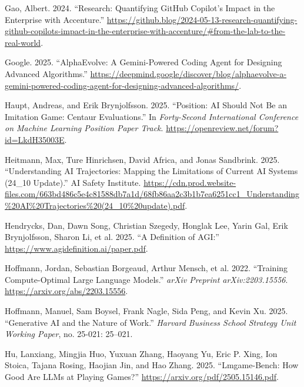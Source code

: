 \documentclass[
  letterpaper,
  DIV=11,
  numbers=noendperiod,
  oneside]{scrartcl}
\newlength{\cslhangindent}
\newenvironment{CSLReferences}[2] %
 {\begin{list}{}{%
  \setlength{\itemindent}{0pt}
  \setlength{\leftmargin}{0pt}
  \setlength{\parsep}{0pt}
  \ifodd #1
   \setlength{\leftmargin}{\cslhangindent}
   \setlength{\itemindent}{-1\cslhangindent}
  \fi
  \setlength{\itemsep}{#2\baselineskip}}}
 {\end{list}}
\begin{document}
\begin{CSLReferences}{1}{0}
Gao, Albert. 2024. {``Research: Quantifying GitHub Copilot's Impact in
the Enterprise with Accenture.''}
\url{https://github.blog/2024-05-13-research-quantifying-github-copilots-impact-in-the-enterprise-with-accenture/\#from-the-lab-to-the-real-world}.

Google. 2025. {``AlphaEvolve: A Gemini-Powered Coding Agent for
Designing Advanced Algorithms.''}
\url{https://deepmind.google/discover/blog/alphaevolve-a-gemini-powered-coding-agent-for-designing-advanced-algorithms/}.

Haupt, Andreas, and Erik Brynjolfsson. 2025. {``Position: {AI} Should
Not Be an Imitation Game: Centaur Evaluations.''} In \emph{Forty-Second
International Conference on Machine Learning Position Paper Track}.
\url{https://openreview.net/forum?id=LkdH35003E}.

Heitmann, Max, Ture Hinrichsen, David Africa, and Jonas Sandbrink. 2025.
{``Understanding AI Trajectories: Mapping the Limitations of Current AI
Systems (24\_10 Update).''} AI Safety Institute.
\url{https://cdn.prod.website-files.com/663bd486c5e4c81588db7a1d/68fb86aa2c3b1b7ea6251cc1_Understanding\%20AI\%20Trajectories\%20(24_10\%20update).pdf}.

Hendrycks, Dan, Dawn Song, Christian Szegedy, Honglak Lee, Yarin Gal,
Erik Brynjolfsson, Sharon Li, et al. 2025. {``A Definition of AGI:''}
\url{https://www.agidefinition.ai/paper.pdf}.

Hoffmann, Jordan, Sebastian Borgeaud, Arthur Mensch, et al. 2022.
{``Training Compute-Optimal Large Language Models.''} \emph{arXiv
Preprint arXiv:2203.15556}. \url{https://arxiv.org/abs/2203.15556}.

Hoffmann, Manuel, Sam Boysel, Frank Nagle, Sida Peng, and Kevin Xu.
2025. {``Generative AI and the Nature of Work.''} \emph{Harvard Business
School Strategy Unit Working Paper}, no. 25-021: 25--021.

Hu, Lanxiang, Mingjia Huo, Yuxuan Zhang, Haoyang Yu, Eric P. Xing, Ion
Stoica, Tajana Rosing, Haojian Jin, and Hao Zhang. 2025.
{``Lmgame-Bench: How Good Are LLMs at Playing Games?''}
\url{https://arxiv.org/pdf/2505.15146.pdf}.


\end{CSLReferences}
\end{document}
